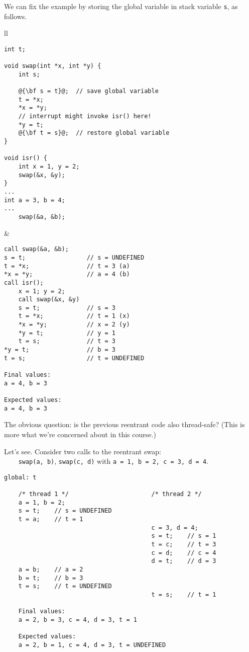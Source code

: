 We can fix the example by storing the global variable in stack variable
{\tt s}, as follows.
\begin{center}
\begin{tabular}{ll}
\begin{minipage}{.5\textwidth}
  \begin{lstlisting}[escapechar=@,basicstyle=\scriptsize]
int t;
 
void swap(int *x, int *y) {
    int s;
 
    @{\bf s = t}@;  // save global variable
    t = *x;
    *x = *y;
    // interrupt might invoke isr() here!
    *y = t;
    @{\bf t = s}@;  // restore global variable
}
 
void isr() {
    int x = 1, y = 2;
    swap(&x, &y);
}
...
int a = 3, b = 4;
...
    swap(&a, &b);
  \end{lstlisting}
\end{minipage} &
\begin{minipage}{.5\textwidth}
  \begin{lstlisting}[basicstyle=\scriptsize]
call swap(&a, &b);
s = t;                 // s = UNDEFINED
t = *x;                // t = 3 (a)
*x = *y;               // a = 4 (b)
call isr();
    x = 1; y = 2;
    call swap(&x, &y)
    s = t;             // s = 3
    t = *x;            // t = 1 (x)
    *x = *y;           // x = 2 (y)
    *y = t;            // y = 1
    t = s;             // t = 3
*y = t;                // b = 3
t = s;                 // t = UNDEFINED

Final values:
a = 4, b = 3

Expected values:
a = 4, b = 3
  \end{lstlisting}
\end{minipage}
\end{tabular}
\end{center}

The obvious question: is the previous reentrant code also thread-safe?
(This is more what we're concerned about in this course.)

  Let's see. Consider two calls to the reentrant swap:\\ \verb+    swap(a, b)+, {\tt swap(c, d)} with {\tt a = 1, b = 2, c = 3, d = 4}.

  \begin{lstlisting}[basicstyle=\scriptsize]
    global: t

    /* thread 1 */                       /* thread 2 */
    a = 1, b = 2;
    s = t;    // s = UNDEFINED
    t = a;    // t = 1
                                         c = 3, d = 4;
                                         s = t;    // s = 1
                                         t = c;    // t = 3
                                         c = d;    // c = 4
                                         d = t;    // d = 3
    a = b;    // a = 2
    b = t;    // b = 3
    t = s;    // t = UNDEFINED
                                         t = s;    // t = 1

    Final values:
    a = 2, b = 3, c = 4, d = 3, t = 1

    Expected values:
    a = 2, b = 1, c = 4, d = 3, t = UNDEFINED
  \end{lstlisting}

